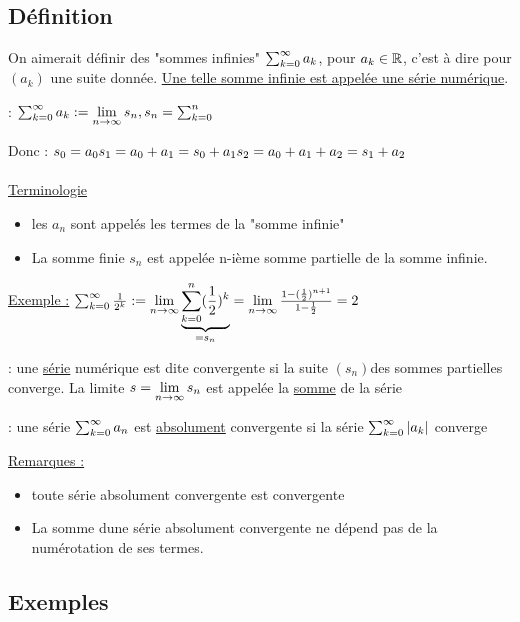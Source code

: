 \documentclass[12pt,a4paper]{article}
\begin{document}
{\subsection{Définition}
On aimerait définir des "sommes infinies" $\sum^{\infty}_{k=0} a_k$, pour $a_k \in \mathbb{R}$, c'est à dire pour $(a_k)$ une suite donnée. \underline{Une telle somme infinie est appelée une série numérique}.
\begin{boite}
\Definition : $\sum^{\infty}_{k=0} a_k := \lim\limits_{n \to \infty} s_n, s_n = \sum^n_{k=0}$
\end{boite}
Donc : $s_0 =a_0\\
s_1 = a_0 + a_1 = s_0 + a_1\\
s_2 = a_0 + a_1 + a_2 = s_1 + a_2$\\
\\
\underline{Terminologie} 
\begin{itemize}
\item les $a_n$ sont appelés les termes de la "somme infinie"
\item La somme finie $s_n$ est appelée n-ième somme partielle de la somme infinie.
\end{itemize}
\underline{Exemple :} $\sum^{\infty}_{k=0} \frac{1}{2^k} := \lim\limits_{n \to \infty}\underbrace{\sum^n_{k=0} (\frac{1}{2})^k}_{=s_n} = \lim\limits_{n \to \infty}\frac{1-(\frac{1}{2})^{n+1}}{1-\frac{1}{2}} = 2$
\begin{boite}
\Definition : une \underline{série} numérique est dite convergente si la suite $(s_n)$des sommes partielles converge. La limite $s= \lim\limits_{n \to \infty} s_n$ est appelée la \underline{somme} de la série
\end{boite}
\begin{boite}
\Definition : une série $\sum^{\infty}_{k=0} a_n$ est \underline{absolument} convergente si la série
$\sum^{\infty}_{k=0} |a_k|$ converge
\end{boite}
\underline{Remarques :}
\begin{itemize}
\item toute série absolument convergente est convergente
\item La somme dune série absolument convergente ne dépend pas de la numérotation de ses termes.
\end{itemize}
\subsection{Exemples}
}
\end{document}
